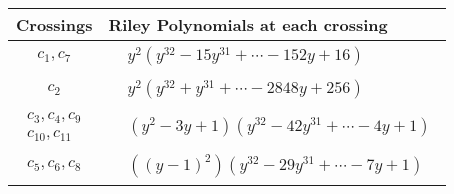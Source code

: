 \documentclass[1p]{elsarticle_modified}
\theoremstyle{definition}
\begin{document}
\begin{tabular}{m{50pt}|m{274pt}}
Crossings & \hspace{64pt}Riley Polynomials at each crossing \\
\hline $$\begin{aligned}c_{1},c_{7}\end{aligned}$$&$\begin{aligned}
&y^2(y^{32}-15 y^{31}+\cdots-152 y+16)
\end{aligned}$\\
\hline $$\begin{aligned}c_{2}\end{aligned}$$&$\begin{aligned}
&y^2(y^{32}+y^{31}+\cdots-2848 y+256)
\end{aligned}$\\
\hline $$\begin{aligned}c_{3},c_{4},c_{9}\\c_{10},c_{11}\end{aligned}$$&$\begin{aligned}
&(y^2-3 y+1)(y^{32}-42 y^{31}+\cdots-4 y+1)
\end{aligned}$\\
\hline $$\begin{aligned}c_{5},c_{6},c_{8}\end{aligned}$$&$\begin{aligned}
&((y-1)^2)(y^{32}-29 y^{31}+\cdots-7 y+1)
\end{aligned}$\\
\hline
\end{tabular}
\vskip 2pc
\end{document}
